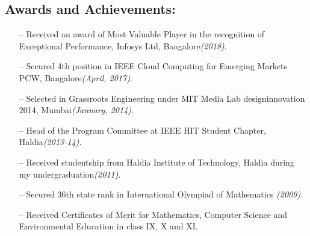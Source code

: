 \documentclass[8pt]{article}
\begin{document}
\subsection*{Awards and Achievements:}
\vspace{-0.2cm}
\begin{itemize}
\item[--]Received an award of Most Valuable Player in the recognition of Exceptional Performance, Infosys Ltd, Bangalore\textit{(2018)}.
\item[--]Secured 4th position in IEEE Cloud Computing for Emerging Markets PCW, Bangalore\textit{(April, 2017)}.
\item[--]Selected in Grassroots Engineering under MIT Media Lab designinnovation 2014, Mumbai\textit{(January, 2014)}.
\item[--]Head of the Program Committee at IEEE HIT Student Chapter, Haldia\textit{(2013-14).}
\item[--]Received studentship from Haldia Institute of Technology, Haldia during my undergraduation\textit{(2011)}.
\item[--] Secured 36th state rank in International Olympiad of Mathematics \textit{(2009)}.

\item[--]Received Certificates of Merit for Mathematics, Computer Science and Environmental Education in class IX, X and XI.
\end{itemize}
\end{document}
